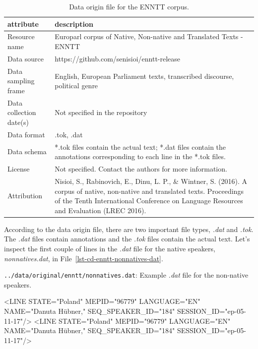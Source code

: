 \documentclass[
  letterpaper,
  DIV=11,
  numbers=noendperiod]{scrreport}
\newenvironment{Shaded}{\begin{snugshade}}{\end{snugshade}}
\newcommand{\NormalTok}[1]{\textcolor[rgb]{0.00,0.00,0.00}{#1}}
\theoremstyle{definition}
\theoremstyle{remark}
\begin{document}
\hypertarget{tbl-cd-enntt-do}{}
\begin{table}
\caption{\label{tbl-cd-enntt-do}Data origin file for the ENNTT corpus. }\tabularnewline

\centering
\begin{tabular}{l|l}
\hline
attribute & description\\
\hline
Resource name & Europarl corpus of Native, Non-native and Translated Texts - ENNTT\\
\hline
Data source & https://github.com/senisioi/enntt-release\\
\hline
Data sampling frame & English, European Parliament texts, transcribed discourse, political genre\\
\hline
Data collection date(s) & Not specified in the repository\\
\hline
Data format & .tok, .dat\\
\hline
Data schema & *.tok files contain the actual text; *.dat files contain the annotations corresponding to each line in the *.tok files.\\
\hline
License & Not specified. Contact the authors for more information.\\
\hline
Attribution & Nisioi, S., Rabinovich, E., Dinu, L. P., \& Wintner, S. (2016). A corpus of native, non-native and translated texts. Proceedings of the Tenth International Conference on Language Resources and Evaluation (LREC 2016).\\
\hline
\end{tabular}
\end{table}

According to the data origin file, there are two important file types,
\emph{.dat} and \emph{.tok}. The \emph{.dat} files contain annotations
and the \emph{.tok} files contain the actual text. Let's inspect the
first couple of lines in the \emph{.dat} file for the native speakers,
\emph{nonnatives.dat}, in File~\ref{lst-cd-enntt-nonnatives-dat}.

\begin{codelisting}

\caption{\texttt{../data/original/enntt/nonnatives.dat}: Example
\emph{.dat} file for the non-native speakers.}

\hypertarget{lst-cd-enntt-nonnatives-dat}{%
\label{lst-cd-enntt-nonnatives-dat}}%
\begin{Shaded}
\begin{Highlighting}[]
\NormalTok{\textless{}LINE STATE="Poland" MEPID="96779" LANGUAGE="EN" NAME="Danuta Hübner," SEQ\_SPEAKER\_ID="184" SESSION\_ID="ep{-}05{-}11{-}17"/\textgreater{}}
\NormalTok{\textless{}LINE STATE="Poland" MEPID="96779" LANGUAGE="EN" NAME="Danuta Hübner," SEQ\_SPEAKER\_ID="184" SESSION\_ID="ep{-}05{-}11{-}17"/\textgreater{}}
\end{Highlighting}
\end{Shaded}

\end{codelisting}
\end{document}
